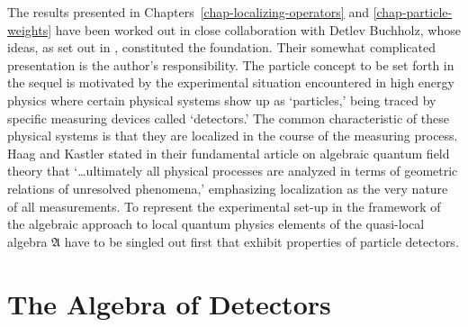 \documentclass[11pt,twoside,openright]{report}
\theoremstyle{definition}
\theoremstyle{plain}
\theoremstyle{remark}
\theoremstyle{assumption}
\newcommand{\Afrak}{\mathfrak{A}}
\begin{document}
The results presented in Chapters~\ref{chap-localizing-operators} and
\ref{chap-particle-weights} have been worked out in close
collaboration with Detlev Buchholz, whose ideas, as set out in
\cite{buchholz:1986b}, constituted the foundation. Their somewhat
complicated presentation is the author's responsibility. The particle
concept to be set forth in the sequel is motivated by the experimental
situation encountered in high energy physics where certain physical
systems show up as `particles,' being traced by specific measuring
devices called `detectors.' The common characteristic of these
physical systems is that they are localized in the course of the
measuring process. Haag and Kastler stated in their fundamental
article \cite{haag/kastler:1964} on algebraic quantum field theory
that `\dots ultimately all physical processes are analyzed in terms of
geometric relations of unresolved phenomena,' emphasizing localization
as the very nature of all measurements. To represent the experimental
set-up in the framework of the algebraic approach to local quantum
physics elements of the quasi-local algebra $\Afrak$ have to be
singled out first that exhibit properties of particle detectors.


\section{The Algebra of Detectors}
\end{document}
